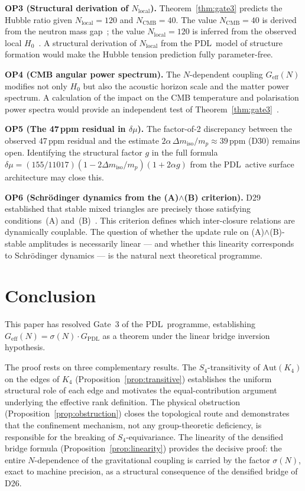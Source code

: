 \documentclass[11pt,a4paper]{article}
\theoremstyle{definition}
\newcommand{\PDL}{\textnormal{PDL}}
\newcommand{\Kfour}{K_4}
\newcommand{\dmu}{\delta\mu}
\newcommand{\dmiso}{\Delta m_{\mathrm{iso}}}
\newcommand{\GPDL}{G_{\mathrm{PDL}}}
\newcommand{\Geff}{G_{\mathrm{eff}}}
\newcommand{\sig}{\sigma}
\newcommand{\Ncmb}{N_{\mathrm{CMB}}}
\newcommand{\Nlocal}{N_{\mathrm{local}}}
\begin{document}
\medskip\noindent\textbf{OP3 (Structural derivation of $N_{\mathrm{local}}$).} Theorem~\ref{thm:gate3} predicts the Hubble ratio given $\Nlocal = 120$ and $\Ncmb = 40$. The value $\Ncmb = 40$ is derived from the neutron mass gap~\cite{NCMB_PDL_2026}; the value $\Nlocal = 120$ is inferred from the observed local $H_0$~\cite{Hubble_PDL_2026}. A structural derivation of $\Nlocal$ from the \PDL\ model of structure formation would make the Hubble tension prediction fully parameter-free.

\medskip\noindent\textbf{OP4 (CMB angular power spectrum).} The $N$-dependent coupling $\Geff(N)$ modifies not only $H_0$ but also the acoustic horizon scale and the matter power spectrum. A calculation of the impact on the CMB temperature and polarisation power spectra would provide an independent test of Theorem~\ref{thm:gate3}~\cite{Planck_2020}.

\medskip\noindent\textbf{OP5 (The 47\,ppm residual in $\dmu$).} The factor-of-2 discrepancy between the observed $47\,\mathrm{ppm}$ residual and the estimate $2\alpha\,\dmiso/m_p \approx 39\,\mathrm{ppm}$ (D30) remains open. Identifying the structural factor $g$ in the full formula $\dmu = (155/11017)(1-2\dmiso/m_p)(1+2\alpha g)$ from the \PDL\ active surface architecture may close this.

\medskip\noindent\textbf{OP6 (Schrödinger dynamics from the (A)$\wedge$(B) criterion).} D29 established that stable mixed triangles are precisely those satisfying conditions~(A) and~(B)~\cite{PDL_D29_2026}. This criterion defines which inter-closure relations are dynamically couplable. The question of whether the update rule on (A)$\wedge$(B)-stable amplitudes is necessarily linear --- and whether this linearity corresponds to Schrödinger dynamics --- is the natural next theoretical programme.

\section*{Conclusion}

This paper has resolved Gate~3 of the \PDL\ programme, establishing $\Geff(N) = \sig(N)\cdot\GPDL$ as a theorem under the linear bridge inversion hypothesis.

The proof rests on three complementary results. The $S_4$-transitivity of $\mathrm{Aut}(\Kfour)$ on the edges of $\Kfour$ (Proposition~\ref{prop:transitive}) establishes the uniform structural role of each edge and motivates the equal-contribution argument underlying the effective rank definition. The physical obstruction (Proposition~\ref{prop:obstruction}) closes the topological route and demonstrates that the confinement mechanism, not any group-theoretic deficiency, is responsible for the breaking of $S_4$-equivariance. The linearity of the densified bridge formula (Proposition~\ref{prop:linearity}) provides the decisive proof: the entire $N$-dependence of the gravitational coupling is carried by the factor $\sig(N)$, exact to machine precision, as a structural consequence of the densified bridge of D26.
\end{document}
